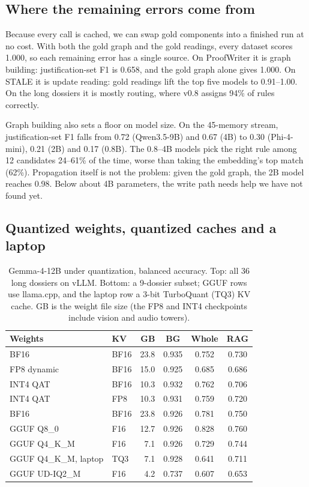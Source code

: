 \documentclass[conference]{IEEEtran}
\begin{document}
\subsection{Where the remaining errors come from}

Because every call is cached, we can swap gold components into a finished run at no cost. With both the gold graph and the gold readings, every dataset scores 1.000, so each remaining error has a single source. On ProofWriter it is graph building: justification-set F1 is 0.658, and the gold graph alone gives 1.000. On STALE it is update reading: gold readings lift the top five models to 0.91--1.00. On the long dossiers it is mostly routing, where v0.8 assigns 94\% of rules correctly.

Graph building also sets a floor on model size. On the 45-memory stream, justification-set F1 falls from 0.72 (Qwen3.5-9B) and 0.67 (4B) to 0.30 (Phi-4-mini), 0.21 (2B) and 0.17 (0.8B). The 0.8--4B models pick the right rule among 12 candidates 24--61\% of the time, worse than taking the embedding's top match (62\%). Propagation itself is not the problem: given the gold graph, the 2B model reaches 0.98. Below about 4B parameters, the write path needs help we have not found yet.

\subsection{Quantized weights, quantized caches and a laptop}

\begin{table}[t]
\caption{Gemma-4-12B under quantization, balanced accuracy. Top: all 36 long dossiers on vLLM. Bottom: a 9-dossier subset; GGUF rows use llama.cpp, and the laptop row a 3-bit TurboQuant (TQ3) KV cache. GB is the weight file size (the FP8 and INT4 checkpoints include vision and audio towers).}
\label{tab:quant}
\centering
\footnotesize
\setlength{\tabcolsep}{3pt}
\begin{tabular}{@{}llrccc@{}}
\toprule
Weights & KV & GB & BG & Whole & RAG \\
\midrule
BF16 & BF16 & 23.8 & 0.935 & 0.752 & 0.730 \\
FP8 dynamic & BF16 & 15.0 & 0.925 & 0.685 & 0.686 \\
INT4 QAT & BF16 & 10.3 & 0.932 & 0.762 & 0.706 \\
INT4 QAT & FP8 & 10.3 & 0.931 & 0.759 & 0.720 \\
\midrule
BF16 & BF16 & 23.8 & 0.926 & 0.781 & 0.750 \\
GGUF Q8\_0 & F16 & 12.7 & 0.926 & 0.828 & 0.760 \\
GGUF Q4\_K\_M & F16 & 7.1 & 0.926 & 0.729 & 0.744 \\
GGUF Q4\_K\_M, laptop & TQ3 & 7.1 & 0.928 & 0.641 & 0.711 \\
GGUF UD-IQ2\_M & F16 & 4.2 & 0.737 & 0.607 & 0.653 \\
\bottomrule
\end{tabular}
\end{table}
\end{document}
